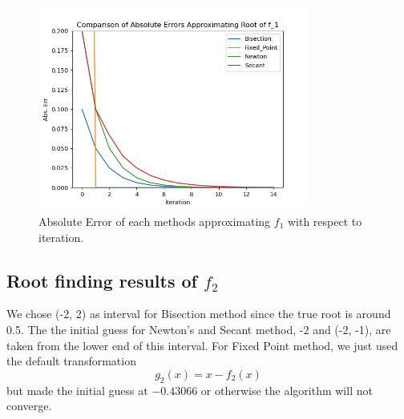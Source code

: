 \documentclass[a4paper,12pt]{article}
\begin{document}
\begin{figure}[H]
    \centering
     \includegraphics[width=0.8\textwidth]{img/report1/f1_err.png}
     \caption{Absolute Error of each methods approximating $f_1$ with respect to iteration.}
     \label{fig:2}   
\end{figure}

\subsection{Root finding results of $f_2$}

We chose (-2, 2) as interval for Bisection method since the true root is around 0.5.
The the initial guess for Newton's and Secant method,
-2 and (-2, -1),
are taken from the lower end of this interval.
For Fixed Point method, we just used the default transformation
$$
g_2(x) = x - f_2(x)
$$
but made the initial guess at $-0.43066$ or otherwise the algorithm will not converge.
\end{document}
